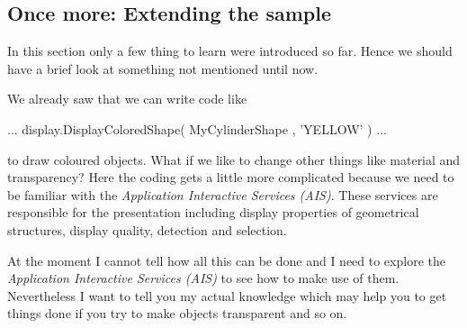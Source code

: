 \subsection{Once more: Extending the sample}
In this section only a few thing to learn were introduced so far.
Hence we should have a brief look at something not mentioned until now.

We already saw that we can write code like 
\begin{python}
...    
    display.DisplayColoredShape( MyCylinderShape , 'YELLOW' ) 
...    
\end{python}
to draw coloured objects.
What if we like to change other things like material and transparency?
Here the coding gets a little more complicated because we need to be familiar with the {\it Application Interactive Services (AIS)}.
These services are responsible for the presentation including display properties of geometrical structures, display quality, detection and selection.

At the moment I cannot tell how all this can be done and I need to explore the  {\it Application Interactive Services (AIS)} to see how to make use of them.
Nevertheless I want to tell you my actual knowledge which may help you to get things done if you try to make objects transparent and so on. 

